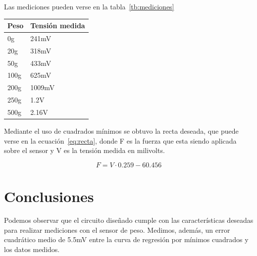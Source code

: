 \documentclass[a4paper, 10pt, spanish]{article}
\begin{document}
    Las mediciones pueden verse en la tabla~\ref{tb:mediciones}

    \begin{center}
        \begin{tabular}{| l | l |}
        \hline
        Peso & Tensión medida \\ \hline
        0g   & 241mV  \\ \hline
        20g  & 318mV  \\ \hline
        50g  & 433mV  \\ \hline
        100g & 625mV  \\ \hline
        200g & 1009mV \\ \hline
        250g & 1.2V   \\ \hline
        500g & 2.16V  \\ \hline
        \end{tabular}
    \end{center}

     Mediante el uso de cuadrados mínimos se obtuvo la recta deseada, que puede verse en la ecuación~\ref{eq:recta}, donde F es la fuerza que esta siendo aplicada sobre el sensor y V es la tensión medida en milivolts.

    \begin{equation}\label{eq:recta}
        F = V\cdot0.259 - 60.456
    \end{equation}


\section{Conclusiones}
Podemos observar que el circuito diseñado cumple con las características deseadas para realizar mediciones con el sensor de peso. Medimos, además, un error cuadrático medio de 5.5mV entre la curva de regresión por mínimos cuadrados y los datos medidos.  
\end{document}
